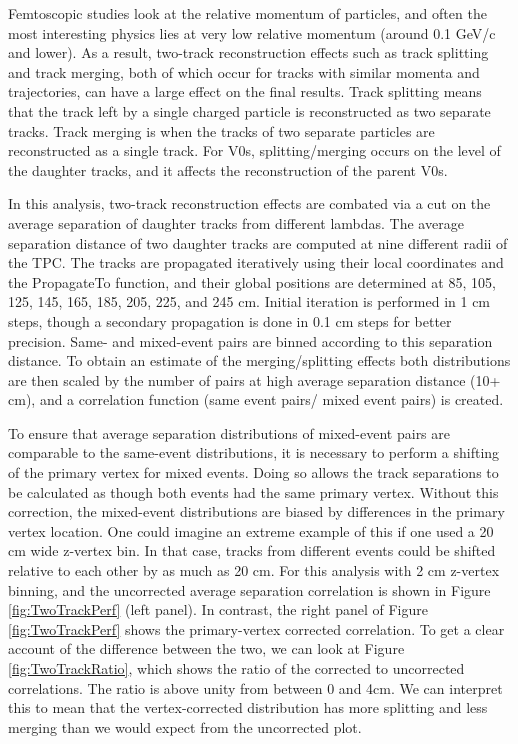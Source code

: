 Femtoscopic studies look at the relative momentum of particles, and often the most interesting physics lies at very low relative momentum (around 0.1 GeV/c and lower).  As a result, two-track reconstruction effects such as track splitting and track merging, both of which occur for tracks with similar momenta and trajectories, can have a large effect on the final results.  Track splitting means that the track left by a single charged particle is reconstructed as two separate tracks. Track merging is when the tracks of two separate particles are reconstructed as a single track.  For V0s, splitting/merging occurs on the level of the daughter tracks, and it affects the reconstruction of the parent V0s.

In this analysis, two-track reconstruction effects are combated via a cut on the average separation of daughter tracks from different lambdas.  The average separation distance of two daughter tracks are computed at nine different radii of the TPC.  The tracks are propagated iteratively using their local coordinates and the PropagateTo function, and their global positions are determined at 85, 105, 125, 145, 165, 185, 205, 225, and 245 cm.  Initial iteration is performed in 1 cm steps, though a secondary propagation is done in 0.1 cm steps for better precision.  Same- and mixed-event pairs are binned according to this separation distance.  To obtain an estimate of the merging/splitting effects both distributions are then scaled by the number of pairs at high average separation distance (10+ cm), and a correlation function (same event pairs/ mixed event pairs) is created. 

To ensure that average separation distributions of mixed-event pairs are comparable to the same-event distributions, it is necessary to perform a shifting of the primary vertex for mixed events.  Doing so allows the track separations to be calculated as though both events had the same primary vertex.  Without this correction, the mixed-event distributions are biased by differences in the primary vertex location.  One could imagine an extreme example of this if one used a 20 cm wide z-vertex bin.  In that case, tracks from different events could be shifted relative to each other by as much as 20 cm.  For this analysis with 2 cm z-vertex binning, and the uncorrected average separation correlation is shown in Figure \ref{fig:TwoTrackPerf} (left panel).  In contrast, the right panel of Figure \ref{fig:TwoTrackPerf} shows the primary-vertex corrected correlation.  To get a clear account of the difference between the two, we can look at Figure \ref{fig:TwoTrackRatio}, which shows the ratio of the corrected to uncorrected correlations.  The ratio is above unity from between 0 and 4cm.  We can interpret this to mean that the vertex-corrected distribution has more splitting and less merging than we would expect from the uncorrected plot.

